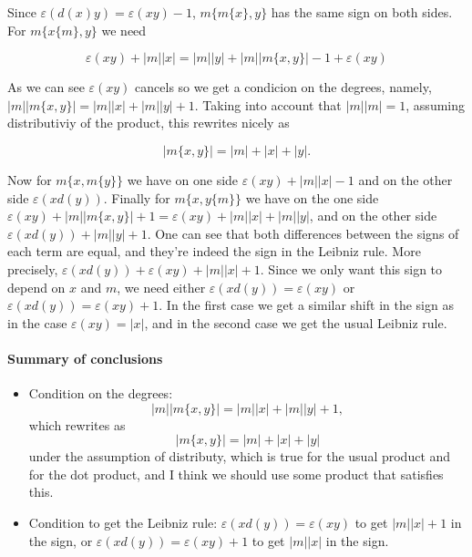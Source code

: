 \documentclass[twoside]{article}
\begin{document}
Since $\varepsilon(d(x)y)=\varepsilon(xy)-1$, $m\{m\{x\},y\}$ has the same sign on both sides. For $m\{x\{m\},y\}$ we need

\[
\varepsilon(xy)+|m||x|=|m||y|+|m||m\{x,y\}|-1+\varepsilon(xy)
\] 

%
%



As we can see $\varepsilon(xy)$ cancels so we get a condicion on the degrees, namely, $|m||m\{x,y\}|=|m||x|+|m||y|+1$. Taking into account that $|m||m|=1$, assuming distributiviy of the product, this rewrites nicely as 

$$|m\{x,y\}|=|m|+|x|+|y|.$$

Now for $m\{x,m\{y\}\}$ we have on one side $\varepsilon(xy)+|m||x|-1$ and on the other side $\varepsilon(xd(y))$. Finally for $m\{x,y\{m\}\}$ we have on the one side $\varepsilon(xy)+|m||m\{x,y\}|+1=\varepsilon(xy)+|m||x|+|m||y|$, and on the other side $\varepsilon(xd(y))+|m||y|+1$. One can see that both differences between the signs of each term are equal, and they're indeed the sign in the Leibniz rule. More precisely, $\varepsilon(xd(y))+\varepsilon(xy)+|m||x|+1$. Since we only want this sign to depend on $x$ and $m$, we need either $\varepsilon(xd(y))=\varepsilon(xy)$ or $\varepsilon(xd(y))=\varepsilon(xy)+1$. In the first case we get a similar shift in the sign as in the case $\varepsilon(xy)=|x|$, and in the second case we get the usual Leibniz rule. 



\paragraph{Summary of conclusions}

\begin{itemize}
\item Condition on the degrees: $$|m||m\{x,y\}|=|m||x|+|m||y|+1,$$
which rewrites as 
$$|m\{x,y\}|=|m|+|x|+|y|$$
under the assumption of distributy, which is true for the usual product and for the dot product, and I think we should use some product that satisfies this.

\item Condition to get the Leibniz rule:  $\varepsilon(xd(y))=\varepsilon(xy)$ to get $|m||x|+1$ in the sign, or $\varepsilon(xd(y))=\varepsilon(xy)+1$ to get $|m||x|$ in the sign.

\end{itemize}
\end{document}
